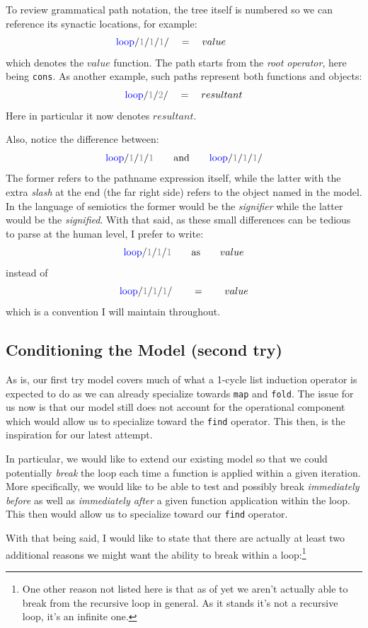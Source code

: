\documentclass[twoside]{article}
\newcommand{\as}{\mbox{as}}
\newcommand{\tcb}[1]{\textcolor{blue}{#1}}
\newcommand{\tcg}[1]{\textcolor{gray}{#1}}
\newcommand{\lp}{\mbox{loop}}
\begin{document}
To review grammatical path notation, the tree itself is numbered so we can reference its synactic locations, for example:
$$ \hspace{-2.7em}\tcb{\lp}/\tcg{1}/\tcg{1}/\tcg{1}/ \quad = \quad value $$
which denotes the $ value $ function. The path starts from the \emph{root operator}, here being \texttt{cons}.
As another example, such paths represent both functions and objects:
$$ \tcb{\lp}/\tcg{1}/\tcg{2}/ \quad = \quad resultant $$
Here in particular it now denotes $ resultant $.

Also, notice the difference between:
$$ \tcb{\lp}/\tcg{1}/\tcg{1}/\tcg{1} \qquad \mbox{and} \qquad \tcb{\lp}/\tcg{1}/\tcg{1}/\tcg{1}/ $$
The former refers to the pathname expression itself, while the latter with the extra \emph{slash} at the end (the far right side)
refers to the object named in the model. In the language of semiotics the former would be the \emph{signifier} while the latter would
be the \emph{signified}. With that said, as these small differences can be tedious to parse at the human level, I prefer to write:
$$ \tcb{\lp}/\tcg{1}/\tcg{1}/\tcg{1} \qquad \as \qquad value $$
instead of 
$$ \tcb{\lp}/\tcg{1}/\tcg{1}/\tcg{1}/ \qquad = \qquad value $$
which is a convention I will maintain throughout.

\subsection*{Conditioning the Model (second try)}

As is, our first try model covers much of what a 1-cycle list induction operator is expected to do as we can already
specialize towards \texttt{map} and \texttt{fold}. The issue for us now is that our model still does not account for
the operational component which would allow us to specialize toward the \texttt{find} operator. This then,
is the inspiration for our latest attempt.

In particular, we would like to extend our existing model so that we could potentially \emph{break} the loop each
time a function is applied within a given iteration. More specifically, we would like to be able to test and possibly
break \emph{immediately before} as well as \emph{immediately after} a given function application within the loop.
This then would allow us to specialize toward our \texttt{find} operator.

With that being said, I would like to state that there are actually at least two additional reasons we might want the ability
to break within a loop:\footnote{One other reason not listed here is that as of yet we aren't actually able to break from
the recursive loop in general. As it stands it's not a recursive loop, it's an infinite one.}
\end{document}

